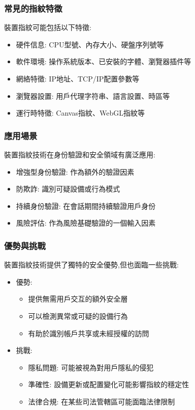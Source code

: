 \subsubsection{常見的指紋特徵}
裝置指紋可能包括以下特徵:
\begin{itemize}
  \item 硬件信息: CPU型號、內存大小、硬盤序列號等
  \item 軟件環境: 操作系統版本、已安裝的字體、瀏覽器插件等
  \item 網絡特徵: IP地址、TCP/IP配置參數等
  \item 瀏覽器設置: 用戶代理字符串、語言設置、時區等
  \item 運行時特徵: Canvas指紋、WebGL指紋等
\end{itemize}

\subsubsection{應用場景}
裝置指紋技術在身份驗證和安全領域有廣泛應用:
\begin{itemize}
  \item 增強型身份驗證: 作為額外的驗證因素
  \item 防欺詐: 識別可疑設備或行為模式
  \item 持續身份驗證: 在會話期間持續驗證用戶身份
  \item 風險評估: 作為風險基礎驗證的一個輸入因素
\end{itemize}

\subsubsection{優勢與挑戰}
裝置指紋技術提供了獨特的安全優勢,但也面臨一些挑戰:
\begin{itemize}
  \item 優勢:
        \begin{itemize}
          \item 提供無需用戶交互的額外安全層
          \item 可以檢測異常或可疑的設備行為
          \item 有助於識別帳戶共享或未經授權的訪問
        \end{itemize}
  \item 挑戰:
        \begin{itemize}
          \item 隱私問題: 可能被視為對用戶隱私的侵犯
          \item 準確性: 設備更新或配置變化可能影響指紋的穩定性
          \item 法律合規: 在某些司法管轄區可能面臨法律限制
        \end{itemize}
\end{itemize}

